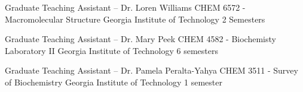 

\begin{cventries}

  \cventry
    {Graduate Teaching Assistant -- Dr. Loren Williams} %
    {CHEM 6572 - Macromolecular Structure} %
    {Georgia Institute of Technology} %
    {2 Semesters} %
    {}
\vspace{-4.0mm}

  \cventry
    {Graduate Teaching Assistant -- Dr. Mary Peek} %
    {CHEM 4582 - Biochemisty Laboratory II} %
    {Georgia Institute of Technology} %
    {6 semesters} %
{}
\vspace{-4.0mm}

  \cventry
    {Graduate Teaching Assistant -- Dr. Pamela Peralta-Yahya} %
    {CHEM 3511 - Survey of Biochemistry} %
    {Georgia Institute of Technology} %
    {1 semester} %
    {}

\vspace{-8.0mm}
\end{cventries}
